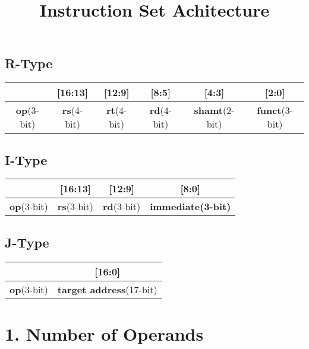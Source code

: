 \documentclass[12pt, onecolumn]{report}
\begin{document}
\newpage
\begin{center}
  \title{\LARGE Instruction Set Achitecture}  
\end{center}
\subsection*{R-Type}
\begin{table}[h]
\centering
\begin{tabular}{|c|c|c|c|c|c|}
\hline
[19:17] & [16:13] & [12:9] & [8:5] & [4:3] & [2:0] \\
\hline
\textbf{op}(3-bit) & \textbf{rs}(4-bit) & \textbf{rt}(4-bit) & \textbf{rd}(4-bit) & \textbf{shamt}(2-bit) & \textbf{funct}(3-bit) \\

\hline
\end{tabular}
\end{table}

\subsection*{I-Type}
\begin{table}[h]
\centering
\begin{tabular}{|c|c|c|c|}
\hline
[19:17] & [16:13] & [12:9] & [8:0] \\
\hline
\textbf{op}(3-bit) & \textbf{rs}(3-bit) & \textbf{rd}(3-bit) & \hspace{1.7cm}\textbf{immediate(3-bit)} \hspace{1.7cm} \\
\hline
\end{tabular}
\end{table}

\subsection*{J-Type}
\begin{table}[h]
\centering
\begin{tabular}{|c|c|}
\hline
[19:17] & [16:0] \\
\hline
\textbf{op}(3-bit) & \hspace{3.25cm}\textbf{target address}(17-bit)\hspace{3.25cm} \\
\hline
\end{tabular}
\end{table}
\hfill


\section*{1. Number of Operands}
\end{document}
